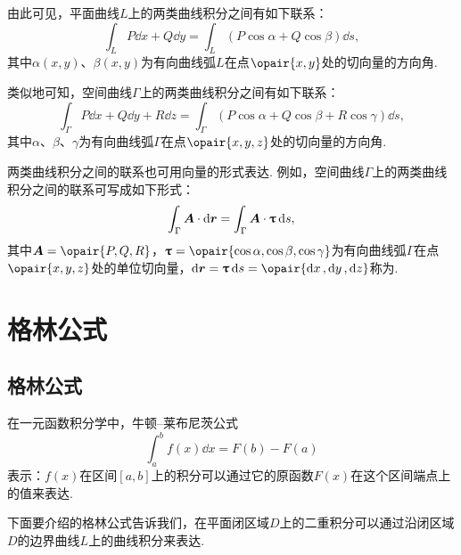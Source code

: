 由此可见，平面曲线\(L\)上的两类曲线积分之间有如下联系：
\begin{equation}\label{equation:线积分与面积分.平面曲线上两类曲线积分之间的联系}
\int_L{P\dd{x}+Q\dd{y}}
=\int_L{(P\cos\alpha+Q\cos\beta)\dd{s}},
\end{equation}
其中\(\alpha(x,y)\)、\(\beta(x,y)\)为有向曲线弧\(L\)在点\(\opair{x,y}\)处的切向量的方向角.

类似地可知，空间曲线\(\Gamma\)上的两类曲线积分之间有如下联系：
\begin{equation}\label{equation:线积分与面积分.空间曲线上两类曲线积分之间的联系}
\int_{\Gamma}{P\dd{x}+Q\dd{y}+R\dd{z}}
=\int_{\Gamma}{(P\cos\alpha+Q\cos\beta+R\cos\gamma)\dd{s}},
\end{equation}其中\(\alpha\)、\(\beta\)、\(\gamma\)为有向曲线弧\(\Gamma\)在点\(\opair{x,y,z}\)处的切向量的方向角.

两类曲线积分之间的联系也可用向量的形式表达.
例如，空间曲线\(\Gamma\)上的两类曲线积分之间的联系可写成如下形式：
\begin{equation}\label{equation:线积分与面积分.空间曲线上两类曲线积分之间的联系的向量形式}
\int_{\Gamma}{\boldsymbol{A} \cdot \dd{\boldsymbol{r}}}
= \int_{\Gamma}{\boldsymbol{A} \cdot \boldsymbol{\uptau} \dd{s}},
\end{equation}其中\(\mat{A}=\opair{P,Q,R}\)，\(\mat{\tau}=\opair{\cos\alpha,\cos\beta,\cos\gamma}\)为有向曲线弧\(\Gamma\)在点\(\opair{x,y,z}\)处的单位切向量，\(\dd{\mat{r}}=\mat{\tau}\dd{s}=\opair{\dd{x},\dd{y},\dd{z}}\)称为.

\section{格林公式}
\subsection{格林公式}
在一元函数积分学中，牛顿--莱布尼茨公式\[
\int_a^b f(x) \dd{x} = F(b) - F(a)
\]表示：\(f(x)\)在区间\([a,b]\)上的积分可以通过它的原函数\(F(x)\)在这个区间端点上的值来表达.

下面要介绍的格林公式告诉我们，在平面闭区域\(D\)上的二重积分可以通过沿闭区域\(D\)的边界曲线\(L\)上的曲线积分来表达.

